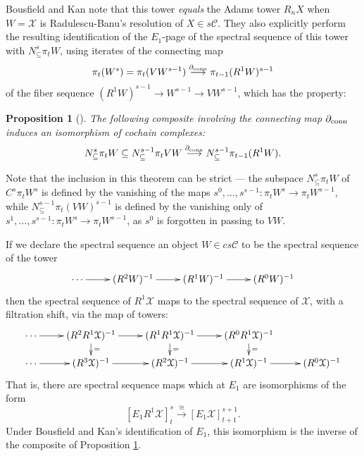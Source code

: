 \documentclass[11pt]{amsart} \renewcommand{\baselinestretch}{1.2}
\theoremstyle{plain}
\newtheorem{prop}[thm]{Proposition}
\numberwithin{equation}{section} %
\theoremstyle{plain}
\newtheorem{prop}[thm]{Proposition}
\numberwithin{equation}{chapter} %
\renewcommand{\to}{\longrightarrow}
\newcommand{\calT}{\mathcal{T}}
\newcommand{\calK}{\mathcal{K}}
\newcommand{\calx}{\mathcal{X}}
\newcommand{\calc}{\mathcal{C}}
\newcommand{\citeBOX}[2][]{\cite[\mbox{#1}]{#2}}
\newcommand{\algcat}{{\calc}}%
\newcommand{\Edownup}[5]{[E_{#1}^{#2}#3]^{#4}_{#5}}
\newcommand{\Dendo}{R}
\begin{document}
\begin{Operations on the Bousfield-Kan spectral sequence}
Bousfield and Kan note \citeBOX[\S3.3 and \S4.2]{BK_pairings_products.pdf} that this tower \emph{equals} the Adams tower $R_nX$ when $W=\calx$ is Radulescu-Banu's resolution of $X\in s\algcat$. They also explicitly perform the resulting identification of the $E_1$-page of the spectral sequence of this tower with $N^s_\subseteq\pi_tW$, using iterates of the connecting map
\[\pi_t(W^{s})=\pi_t(VW^{s-1})\overset{\partial_\textup{conn} }{\to}\pi_{t-1}(\Dendo^1W)^{s-1}\]
of the fiber sequence $(\Dendo^1W)^{s-1}\to W^{s-1}\to VW^{s-1}$, which has the property:
\begin{prop}[{\cite[Proposition 5.2]{BK_pairings_products.pdf}}]
\label{BK D1 is awesome}
The following composite involving the connecting map $\partial_\textup{conn}$ induces an isomorphism of cochain complexes:
\[N^s_\subseteq \pi_t W\subseteq N^{s-1}_\subseteq \pi_t VW \overset{\partial_\textup{conn}}{\to}N^{s-1}_\subseteq \pi_{t-1} (\Dendo^1W).\]
\end{prop}
\noindent Note that the inclusion in this theorem can be strict --- the subspace $N^s_\subseteq \pi_t W$ of $C^s\pi_t W^s$ is defined by the vanishing of the maps $s^0,\ldots,s^{s-1}:\pi_t W^s\to \pi_t W^{s-1}$, while $ N^{s-1}_\subseteq \pi_t (VW)^{s-1}$ is defined by the vanishing only of $s^1,\ldots,s^{s-1}:\pi_t W^s\to \pi_t W^{s-1}$, as $s^0$ is forgotten in passing to $VW$.

If we declare the spectral sequence an object $W\in cs\algcat$ to be the spectral sequence of the tower
\[\xymatrix@R=4mm{
\cdots 
\ar[r]
&%
(\Dendo^2W)^{-1}
\ar[r]
&%
(\Dendo^1W)^{-1}
\ar[r]&%
(\Dendo^0W)^{-1}
}\]
then the spectral sequence of $\Dendo^1\calx$ maps to the spectral sequence of $\calx$, with a filtration shift, via the map of towers:
\[\xymatrix@R=4mm{
\cdots 
\ar[r]
&%
(\Dendo^2\Dendo^1\calx)^{-1}
\ar[r]\ar[d]^{=}
&%
(\Dendo^1\Dendo^1\calx)^{-1}
\ar[r]\ar[d]^{=}
&%
(\Dendo^0\Dendo^1\calx)^{-1}
\ar[d]^{=}
\\
\cdots 
\ar[r]
&%
(\Dendo^3\calx)^{-1}
\ar[r]
&%
(\Dendo^2\calx)^{-1}
\ar[r]
&%
(\Dendo^1\calx)^{-1}
\ar[r]&%
(\Dendo^0\calx)^{-1}
}\]
That is, there are spectral sequence maps which at $E_1$ are isomorphisms  of the form
\[\Edownup{1}{}{\Dendo^1\calx}{s}{t}\overset{\cong}{\to} \Edownup{1}{}{\calx}{s+1}{t+1}.\]
Under Bousfield and Kan's identification of $E_1$, this isomorphism is the inverse of the composite of Proposition \ref{BK D1 is awesome}.


\end{Operations on the Bousfield-Kan spectral sequence}
\end{document}
